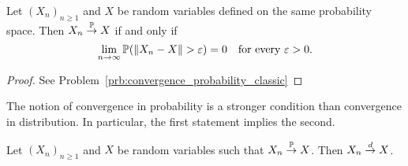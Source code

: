 \begin{lemma}\label{lem:convergence_probability_classical}
Let $(X_n)_{n \ge 1}$ and $X$ be random variables defined on the same probability space. Then $X_n \stackrel{\mathbb P}{\rightarrow} X$ if and only if
\[
	\lim_{n \to \infty} \mathbb P(\|X_n - X\| > \varepsilon) = 0 \quad \text{for every } \varepsilon > 0.
\]
\end{lemma}

\begin{proof}
See Problem~\ref{prb:convergence_probability_classic}
\end{proof}


The notion of convergence in probability is a stronger condition than convergence in distribution. In particular, the first statement implies the second. 

\begin{lemma}\label{lem:convergence_prob_implies_d}
Let $(X_n)_{n \ge 1}$ and $X$ be random variables such that $X_n \stackrel{\mathbb P}{\rightarrow} X$. Then $X_n \stackrel{d}{\rightarrow} X$.
\end{lemma}

